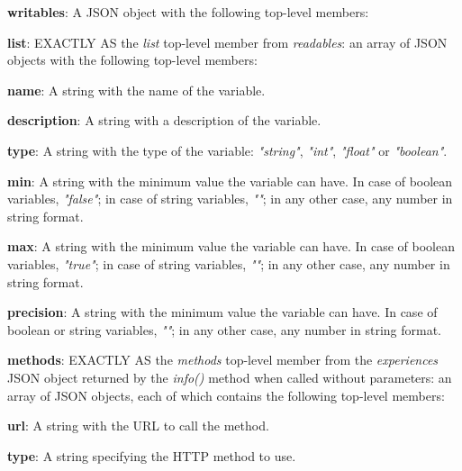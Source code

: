 \begin{myEnumerate}
\begin{myEnumerate}
\begin{myEnumerate}
\begin{myEnumerate}
\begin{myEnumerate}
                    \end{myEnumerate}
            \end{myEnumerate}
        \end{myEnumerate}
    \end{myEnumerate}
    \item \textbf{writables}: A JSON object with the following top-level members:
    \begin{myEnumerate}
        \item \textbf{list}: EXACTLY AS the \textit{list} top-level member from \textit{readables}: an array of JSON objects with the following top-level members:
        \begin{myEnumerate}
            \item \textbf{name}: A string with the name of the variable.
            \item \textbf{description}: A string with a description of the variable.
            \item \textbf{type}: A string with the type of the variable: \textit{"string"}, \textit{"int"}, \textit{"float"} or \textit{"boolean"}.
            \item \textbf{min}: A string with the minimum value the variable can have. In case of boolean variables, \textit{"false"}; in case of string variables, \textit{""}; in any other case, any number in string format.
            \item \textbf{max}: A string with the minimum value the variable can have. In case of boolean variables, \textit{"true"}; in case of string variables, \textit{""}; in any other case, any number in string format.
            \item \textbf{precision}: A string with the minimum value the variable can have. In case of boolean or string variables, \textit{""}; in any other case, any number in string format.
        \end{myEnumerate}
        \item \textbf{methods}: EXACTLY AS the \textit{methods} top-level member from the \textit{experiences} JSON object returned by the \textit{info()} method when called without parameters: an array of JSON objects, each of which contains the following top-level members:
        \begin{myEnumerate}
            \item \textbf{url}: A string with the URL to call the method.
            \item \textbf{type}: A string specifying the HTTP method to use.

\end{myEnumerate}
\end{myEnumerate}
\end{myEnumerate}
